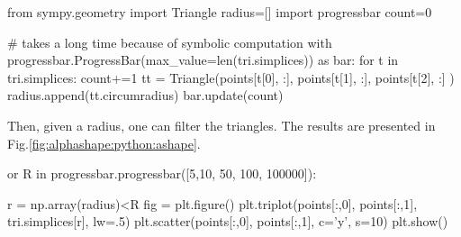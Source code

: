 \begin{python}
from sympy.geometry import Triangle
radius=[]
import progressbar
count=0

# takes a long time because of symbolic computation
with progressbar.ProgressBar(max_value=len(tri.simplices)) as bar:
    for t in tri.simplices:
        count+=1
        tt = Triangle(points[t[0], :], points[t[1], :], points[t[2], :] )
        radius.append(tt.circumradius)
        bar.update(count)
\end{python}


Then, given a radius,  one can filter the triangles. The results are presented in Fig.\ref{fig:alphashape:python:ashape}.

\begin{python}
 or R in progressbar.progressbar([5,10, 50, 100, 100000]):
    
    r = np.array(radius)<R
    fig = plt.figure()
    plt.triplot(points[:,0], points[:,1], tri.simplices[r], lw=.5)
    plt.scatter(points[:,0], points[:,1], c='y', s=10)
    plt.show()
\end{python}

